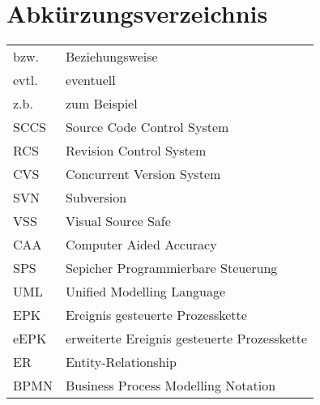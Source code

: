 \chapter*{Abkürzungsverzeichnis}
\begin{tabular}{ll}
bzw. & Beziehungsweise \\
evtl. & eventuell \\ 
z.b. & zum Beispiel \\
SCCS & Source Code Control System \\ 
RCS & Revision Control System \\ 
CVS & Concurrent Version System \\
SVN & Subversion \\
VSS & Visual Source Safe \\
CAA & Computer Aided Accuracy \\
SPS & Sepicher Programmierbare Steuerung \\
UML & Unified Modelling Language \\
EPK & Ereignis gesteuerte Prozesskette \\
eEPK & erweiterte Ereignis gesteuerte Prozesskette \\
ER & Entity-Relationship \\
BPMN & Business Process Modelling Notation \\
\end{tabular} 